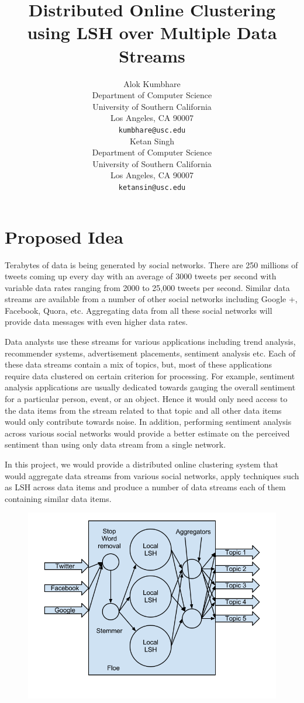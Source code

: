 \documentclass{article} %
\title{Distributed Online Clustering using LSH over Multiple Data Streams}
\author{
Alok Kumbhare \\
Department of Computer Science \\
University of Southern California \\
Los Angeles, CA 90007 \\
\texttt{kumbhare@usc.edu} \\
\And
Ketan Singh \\
Department of Computer Science \\
University of Southern California \\
Los Angeles, CA 90007 \\
\texttt{ketansin@usc.edu} \\
}
\begin{document}
\maketitle



\section{Proposed Idea}
Terabytes of data is being generated by social networks. There are 250 millions of tweets coming up every day with an average of 3000 tweets per second  with variable data rates ranging from 2000 to 25,000 tweets per second. Similar data streams are available from a number of other social networks including Google +, Facebook, Quora, etc.  Aggregating data from all these social networks will provide data messages with even higher data rates. 

Data analysts use these streams for various applications including trend analysis, recommender systems, advertisement placements, sentiment analysis etc. Each of these data streams contain a mix of topics, but, most of these applications require data clustered on certain criterion for processing. For example, sentiment analysis applications are usually dedicated towards gauging the overall sentiment for a particular person, event, or an object. Hence it would only need access to the data items from the stream related to that topic and all other data items would only contribute towards noise. In addition, performing sentiment analysis across various social networks would provide a better  estimate on the perceived  sentiment than using only data stream from a single network.

In this project, we would provide a distributed online clustering system that would aggregate data streams from various social networks, apply techniques such as LSH across data items and produce a number of data streams each of them containing  similar data items.

\begin{figure}[!ht]
\includegraphics[width=\textwidth]{fig.png}
\end{figure}
\end{document}
